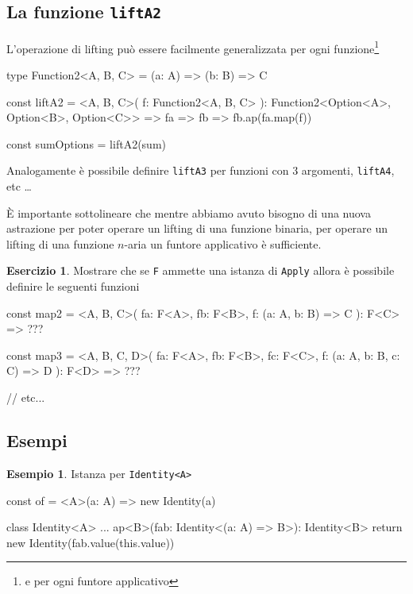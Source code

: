 \documentclass[12pt]{article}
\theoremstyle{definition}
\newtheorem{example}{Esempio}[section]
\newtheorem{exercise}{Esercizio}[section]
\newenvironment{code}
  {\vspace{0.5cm} \VerbatimEnvironment\begin{typescriptcode}}
  {\end{typescriptcode} \vspace{0.2cm}}
\begin{document}
\subsection{La funzione \texttt{liftA2}}

L'operazione di lifting può essere facilmente generalizzata per ogni funzione\footnote{e per ogni funtore applicativo}

\begin{code}
type Function2<A, B, C> = (a: A) => (b: B) => C

const liftA2 = <A, B, C>(
  f: Function2<A, B, C>
): Function2<Option<A>, Option<B>, Option<C>> => fa => fb =>
  fb.ap(fa.map(f))

const sumOptions = liftA2(sum)
\end{code}

Analogamente è possibile definire \texttt{liftA3} per funzioni con 3 argomenti, \texttt{liftA4}, etc \ldots

È importante sottolineare che mentre abbiamo avuto bisogno di una nuova astrazione per poter operare un lifting di una funzione binaria,
per operare un lifting di una funzione $n$-aria un funtore applicativo è sufficiente.

\begin{exercise}
Mostrare che se \texttt{F} ammette una istanza di \texttt{Apply} allora è possibile definire le seguenti funzioni

\begin{code}
const map2 = <A, B, C>(
  fa: F<A>,
  fb: F<B>,
  f: (a: A, b: B) => C
): F<C> => ???

const map3 = <A, B, C, D>(
  fa: F<A>,
  fb: F<B>,
  fc: F<C>,
  f: (a: A, b: B, c: C) => D
): F<D> => ???

// etc...
\end{code}
\end{exercise}

\subsection{Esempi}

\begin{example}
Istanza per \texttt{Identity<A>}

\begin{code}
const of = <A>(a: A) => new Identity(a)

class Identity<A> {
  ...
  ap<B>(fab: Identity<(a: A) => B>): Identity<B> {
    return new Identity(fab.value(this.value))
  }
}
\end{code}
\end{example}
\end{document}
